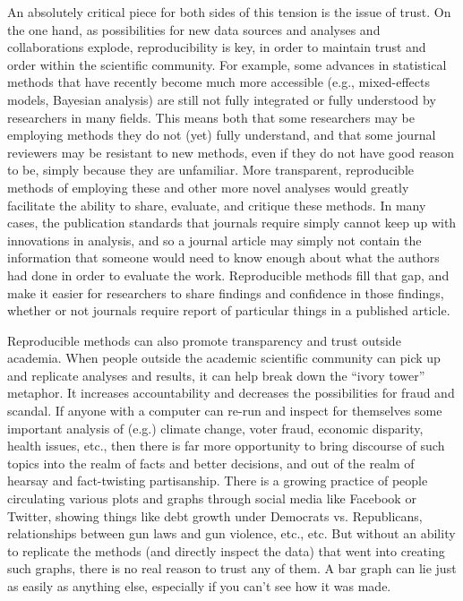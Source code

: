 \documentclass{book}
\begin{document}
An absolutely critical piece for both sides of this tension is the issue of trust.  On the one hand, as possibilities for new data sources and analyses and collaborations explode, reproducibility is key, in order to maintain trust and order within the scientific community.  For example, some advances in statistical methods that have recently become much more accessible (e.g., mixed-effects models, Bayesian analysis) are still not fully integrated or fully understood by researchers in many fields.  This means both that some researchers may be employing methods they do not (yet) fully understand, and that some journal reviewers may be resistant to new methods, even if they do not have good reason to be, simply because they are unfamiliar. More transparent, reproducible methods of employing these and other more novel analyses would greatly facilitate the ability to share, evaluate, and critique these methods. In many cases, the publication standards that journals require simply cannot keep up with innovations in analysis, and so a journal article may simply not contain the information that someone would need to know enough about what the authors had done in order to evaluate the work. Reproducible methods fill that gap, and make it easier for researchers to share findings and confidence in those findings, whether or not journals require report of particular things in a published article.

Reproducible methods can also promote transparency and trust outside academia.  When people outside the academic scientific community can pick up and replicate analyses and results, it can help break down the ``ivory tower'' metaphor.  It increases accountability and decreases the possibilities for fraud and scandal. If anyone with a computer can re-run and inspect for themselves some important analysis of (e.g.) climate change, voter fraud, economic disparity, health issues, etc., then there is far more opportunity to bring discourse of such topics into the realm of facts and better decisions, and out of the realm of hearsay and fact-twisting partisanship.  There is a growing practice of people circulating various plots and graphs through social media like Facebook or Twitter, showing things like debt growth under Democrats vs. Republicans, relationships between gun laws and gun violence, etc., etc.  But without an ability to replicate the methods (and directly inspect the data) that went into creating such graphs, there is no real reason to trust any of them.  A bar graph can lie just as easily as anything else, especially if you can't see how it was made. 
\end{document}
